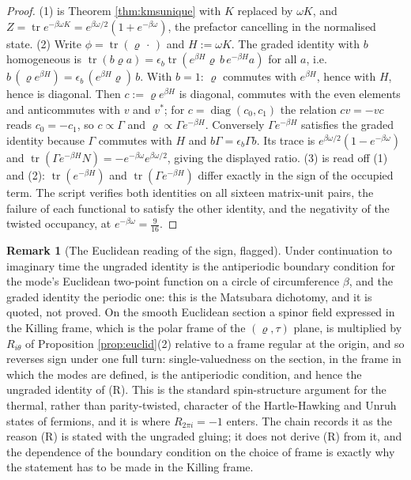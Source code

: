 \documentclass[11pt]{article}
\theoremstyle{definition}
\newtheorem{remark}[theorem]{Remark}
\newcommand{\tr}{\operatorname{tr}}
\begin{document}
\begin{proof}
(1) is Theorem \ref{thm:kmsunique} with $K$ replaced by $\omega K$, and $Z = \tr e^{-\beta\omega K} = e^{\beta\omega/2}(1 + e^{-\beta\omega})$, the prefactor cancelling in the normalised state. (2) Write $\phi = \tr(\varrho\,\cdot\,)$ and $H := \omega K$. The graded identity with $b$ homogeneous is $\tr(b\varrho a) = \epsilon_b\tr(e^{\beta H}\varrho\,b\,e^{-\beta H}a)$ for all $a$, i.e.\ $b\,(\varrho e^{\beta H}) = \epsilon_b\,(e^{\beta H}\varrho)\,b$. With $b = 1$: $\varrho$ commutes with $e^{\beta H}$, hence with $H$, hence is diagonal. Then $c := \varrho e^{\beta H}$ is diagonal, commutes with the even elements and anticommutes with $v$ and $v^{*}$; for $c = \operatorname{diag}(c_0, c_1)$ the relation $cv = -vc$ reads $c_0 = -c_1$, so $c \propto \Gamma$ and $\varrho \propto \Gamma e^{-\beta H}$. Conversely $\Gamma e^{-\beta H}$ satisfies the graded identity because $\Gamma$ commutes with $H$ and $b\Gamma = \epsilon_b\Gamma b$. Its trace is $e^{\beta\omega/2}(1 - e^{-\beta\omega})$ and $\tr(\Gamma e^{-\beta H}N) = -e^{-\beta\omega}e^{\beta\omega/2}$, giving the displayed ratio. (3) is read off (1) and (2): $\tr(e^{-\beta H}) $ and $\tr(\Gamma e^{-\beta H})$ differ exactly in the sign of the occupied term. The script verifies both identities on all sixteen matrix-unit pairs, the failure of each functional to satisfy the other identity, and the negativity of the twisted occupancy, at $e^{-\beta\omega} = \tfrac{9}{16}$.
\end{proof}

\begin{remark}[The Euclidean reading of the sign, flagged]\label{rem:spinstructure}
Under continuation to imaginary time the ungraded identity is the antiperiodic boundary condition for the mode's Euclidean two-point function on a circle of circumference $\beta$, and the graded identity the periodic one: this is the Matsubara dichotomy, and it is quoted, not proved. On the smooth Euclidean section a spinor field expressed in the Killing frame, which is the polar frame of the $(\varrho, \tau)$ plane, is multiplied by $R_{i\theta}$ of Proposition \ref{prop:euclid}(2) relative to a frame regular at the origin, and so reverses sign under one full turn: single-valuedness on the section, in the frame in which the modes are defined, is the antiperiodic condition, and hence the ungraded identity of (R). This is the standard spin-structure argument for the thermal, rather than parity-twisted, character of the Hartle-Hawking and Unruh states of fermions, and it is where $R_{2\pi i} = -1$ enters. The chain records it as the reason (R) is stated with the ungraded gluing; it does not derive (R) from it, and the dependence of the boundary condition on the choice of frame is exactly why the statement has to be made in the Killing frame.
\end{remark}
\end{document}
